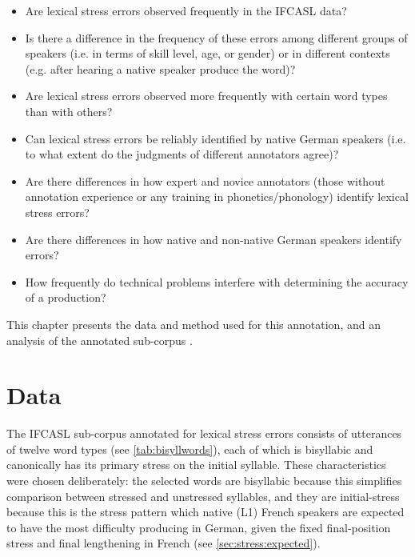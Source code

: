 	\begin{itemize}
	\item{Are lexical stress errors observed frequently in the IFCASL data?}
	\item{Is there a difference in the frequency of these errors among different groups of speakers (i.e. in terms of skill level, age, or gender) or in different contexts (e.g. after hearing a native speaker produce the word)?}
	\item{Are lexical stress errors observed more frequently with certain word types than with others?}
	\item{Can lexical stress errors be reliably identified by native German speakers (i.e. to what extent do the judgments of different annotators agree)?}
	\item{Are there differences in how expert and novice annotators (those without annotation experience or any training in phonetics/phonology) identify lexical stress errors?} 
	\item{Are there differences in how native and non-native German speakers identify errors?}
	\item{How frequently do technical problems interfere with determining the accuracy of a production?}
	\end{itemize}
	
	
	This chapter presents the data and method used for this annotation, and an analysis of the annotated sub-corpus . 
	
	\section{Data}
	\label{sec:lexstress:data}
	
	The IFCASL sub-corpus annotated for lexical stress errors consists of utterances of twelve word types (see \cref{tab:bisyllwords}), each of which is bisyllabic and canonically has its primary stress on the initial syllable. These characteristics were chosen deliberately: the selected words are bisyllabic because this simplifies comparison between stressed and unstressed syllables, and they are initial-stress because this is the stress pattern which native (L1) French speakers are expected to have the most difficulty producing in German, given the fixed final-position stress and final lengthening in French (see \cref{sec:stress:expected}). 
	
